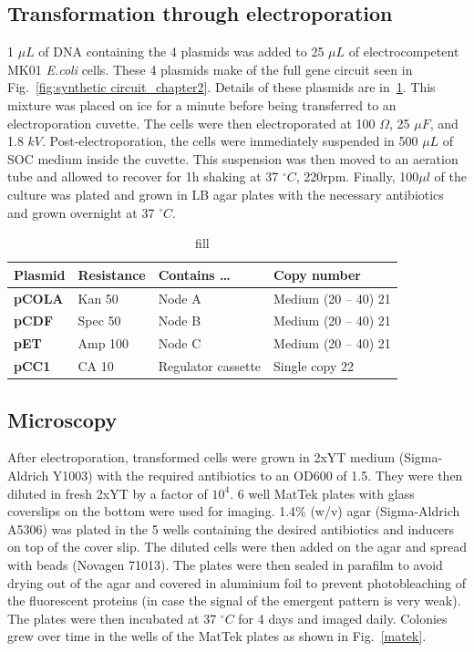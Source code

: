 \subsection{Transformation through electroporation}\label{electroporation}
1 $\mu L$ of DNA containing the 4 plasmids was added to 25 $\mu L$ of electrocompetent MK01 \textit{E.coli} cells.
These 4 plasmids make of the full gene circuit seen in Fig.~\ref{fig:synthetic circuit_chapter2}.
Details of these plasmids are in~\ref{tab:plasmid table}.
This mixture was placed on ice for a minute before being transferred to an electroporation cuvette.
The cells were then electroporated at 100 $\Omega$, 25 $\mu F$, and 1.8 $kV$.
Post-electroporation, the cells were immediately suspended in 500 $\mu L$ of SOC medium inside the cuvette.
This suspension was then moved to an aeration tube and allowed to recover for 1h shaking at 37 $^{\circ} C$, 220rpm.
Finally, 100$\mu l$ of the culture was plated and grown in LB agar plates with the necessary antibiotics and grown overnight at 37 $^{\circ} C$.
%
\begin{table}[H]
    \centering
    \begin{tabular}{llll}
        \toprule
        \textbf{Plasmid} & \textbf{Resistance} & \textbf{Contains …} & \textbf{Copy number} \\
        \midrule
        \textbf{pCOLA} & Kan 50 & Node A & Medium (20 – 40) 21 \\
        \textbf{pCDF} & Spec 50 & Node B & Medium (20 – 40) 21 \\
        \textbf{pET} & Amp 100 & Node C & Medium (20 – 40) 21 \\
        \textbf{pCC1} & CA 10 & Regulator cassette & Single copy 22 \\
        \bottomrule
    \end{tabular}
    \caption{fill}
    \label{tab:plasmid table}
\end{table}


\subsection{Microscopy}\label{microscopy}
After electroporation, transformed cells were grown in 2xYT medium (Sigma-Aldrich Y1003) with the required antibiotics to an OD600 of 1.5. They were then diluted in fresh 2xYT by a factor of $10^4$.
6 well MatTek plates with glass coverslips on the bottom were used for imaging.
1.4\% (w/v) agar (Sigma-Aldrich A5306) was plated in the 5 wells containing the desired antibiotics and inducers on top of the cover slip.
The diluted cells were then added on the agar and spread with beads (Novagen 71013).
The plates were then sealed in parafilm to avoid drying out of the agar and covered in aluminium foil to prevent photobleaching of the fluorescent proteins (in case the signal of the emergent pattern is very weak).
The plates were then incubated at 37 $^{\circ} C$ for 4 days and imaged daily.
Colonies grew over time in the wells of the MatTek plates as shown in Fig.~\ref{matek}.


